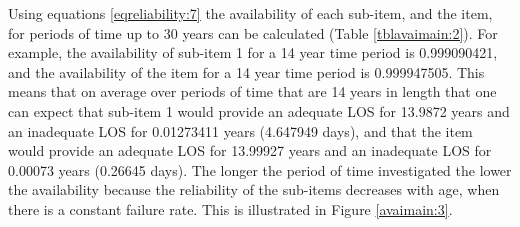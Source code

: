 Using equations \eqref{eqreliability:7} the availability of each sub-item, and the item, for periods
of time up to 30 years can be calculated (Table \ref{tblavaimain:2}). For example, the
availability of sub-item 1 for a 14 year time period is 0.999090421, and the
availability of the item for a 14 year time period is 0.999947505. This means
that on average over periods of time that are 14 years in length that one can
expect that sub-item 1 would provide an adequate LOS for 13.9872 years and an
inadequate LOS for 0.01273411 years (4.647949 days), and that the item would
provide an adequate LOS for 13.99927 years and an inadequate LOS for 0.00073
years (0.26645 days). The longer the period of time investigated the lower the
availability because the reliability of the sub-items decreases with age, when
there is a constant failure rate. This is illustrated in Figure \ref{avaimain:3}.

